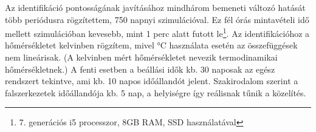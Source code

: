 Az identifikáció pontosságának javításához mindhárom bemeneti változó hatását több periódusra rögzítettem, 750 napnyi szimulációval. Ez fél órás mintavételi idő mellett szimulációban kevesebb, mint 1 perc alatt futott le\footnote{7. generációs i5 processzor, 8GB RAM, SSD használatával}. Az identifikációhoz a hőmérsékletet kelvinben rögzítem, mivel \si{\celsius} használata esetén az összefüggések nem lineárisak. (A kelvinben mért hőmérsékletet nevezik termodinamikai hőmérsékletnek.) A fenti esetben a beállási idők kb. 30 naposak az egész rendszert tekintve, ami kb. 10 napos időállandót jelent. Szakirodalom szerint a falszerkezetek időállandója kb. 5 nap, a helyiségre így reálisnak tűnik a közelítés.
%
%
%
%


\pagebreak